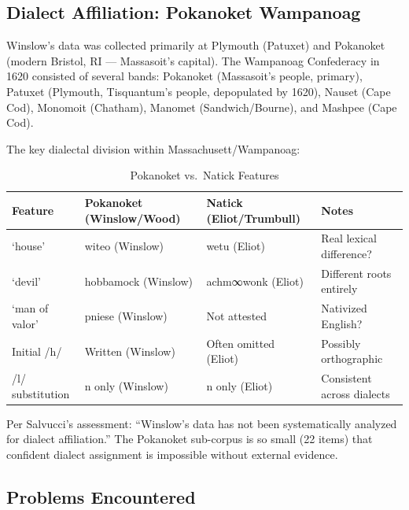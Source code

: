 \subsection{Dialect Affiliation: Pokanoket Wampanoag}

Winslow's data was collected primarily at Plymouth (Patuxet) and Pokanoket
(modern Bristol, RI --- Massasoit's capital). The Wampanoag Confederacy in 1620
consisted of several bands: Pokanoket (Massasoit's people, primary), Patuxet
(Plymouth, Tisquantum's people, depopulated by 1620), Nauset (Cape Cod),
Monomoit (Chatham), Manomet (Sandwich/Bourne), and Mashpee (Cape Cod).

The key dialectal division within Massachusett/Wampanoag:

\begin{table}[htbp]
\centering
\caption{Pokanoket vs.\ Natick Features}
\label{tab:1366-dialect}
\begin{tabular}{llll}
\hline
Feature & Pokanoket (Winslow/Wood) & Natick (Eliot/Trumbull) & Notes \\
\hline
`house' & witeo (Winslow) & wetu (Eliot) & Real lexical difference? \\
`devil' & hobbamock (Winslow) & achm∞wonk (Eliot) & Different roots entirely \\
`man of valor' & pniese (Winslow) & Not attested & Nativized English? \\
Initial /h/ & Written (Winslow) & Often omitted (Eliot) & Possibly orthographic \\
/l/ substitution & n only (Winslow) & n only (Eliot) & Consistent across dialects \\
\hline
\end{tabular}
\end{table}

Per Salvucci's assessment: ``Winslow's data has not been systematically
analyzed for dialect affiliation.'' The Pokanoket sub-corpus is so small (22
items) that confident dialect assignment is impossible without external
evidence.

\subsection{Problems Encountered}

